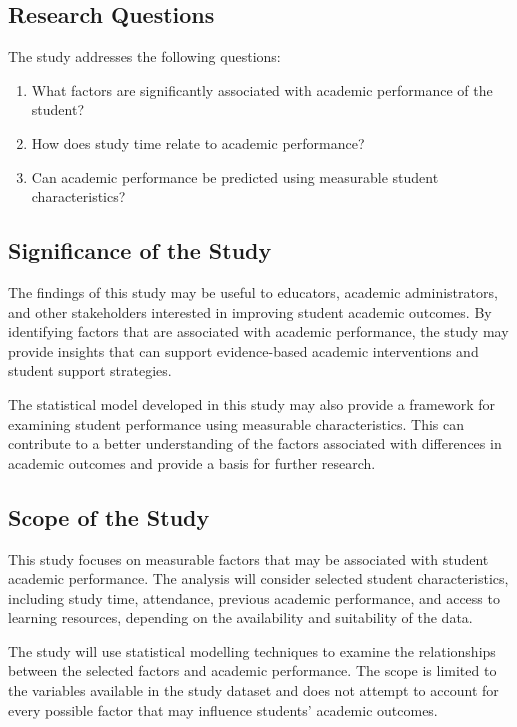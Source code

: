 \subsection{Research Questions}

The study addresses the following questions:

\begin{enumerate}
    \item What factors are significantly associated with academic performance of the student?
    \item How does study time relate to academic performance?
    \item Can academic performance be predicted using measurable student characteristics?
\end{enumerate}


 \subsection{Significance of the Study}

The findings of this study may be useful to educators, academic administrators, and other stakeholders interested in improving student academic outcomes. By identifying factors that are associated with academic performance, the study may provide insights that can support evidence-based academic interventions and student support strategies.

The statistical model developed in this study may also provide a framework for examining student performance using measurable characteristics. This can contribute to a better understanding of the factors associated with differences in academic outcomes and provide a basis for further research.

\subsection{Scope of the Study}

This study focuses on measurable factors that may be associated with student academic performance. The analysis will consider selected student characteristics, including study time, attendance, previous academic performance, and access to learning resources, depending on the availability and suitability of the data.

The study will use statistical modelling techniques to examine the relationships between the selected factors and academic performance. The scope is limited to the variables available in the study dataset and does not attempt to account for every possible factor that may influence students' academic outcomes.